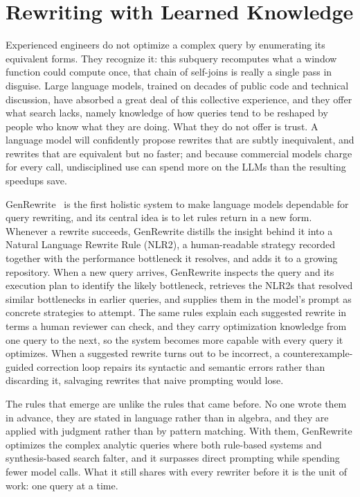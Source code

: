 \section{Rewriting with Learned Knowledge}
\label{sec:intro:knowledge}

Experienced engineers do not optimize a complex query by enumerating its
equivalent forms. They recognize it: this subquery recomputes what a
window function could compute once, that chain of self-joins is really a
single pass in disguise. Large language models, trained on decades of
public code and technical discussion, have absorbed a great deal of this
collective experience, and they offer what search lacks, namely
knowledge of how queries tend to be reshaped by people who know what
they are doing. What they do not offer is trust. A language model will confidently
propose rewrites that are subtly inequivalent, and rewrites that are
equivalent but no faster; and because commercial models charge for
every call, undisciplined use can spend more on the LLMs than the
resulting speedups save.

GenRewrite~\cite{genrewrite} is the first holistic system to make
language models dependable for query rewriting, and its central idea is to let rules
return in a new form. Whenever a rewrite succeeds, GenRewrite distills
the insight behind it into a Natural Language Rewrite Rule (NLR2), a
human-readable strategy recorded together with the performance
bottleneck it resolves, and adds it to a growing repository. When a new
query arrives, GenRewrite inspects the query and its execution plan to
identify the likely bottleneck, retrieves the NLR2s that resolved
similar bottlenecks in earlier queries, and supplies them in the
model's prompt as concrete strategies to attempt. The same rules
explain each suggested rewrite in terms a human reviewer can check, and
they carry optimization knowledge from one query to the next, so the
system becomes more capable with every query it optimizes. When a
suggested rewrite turns out to be incorrect, a counterexample-guided
correction loop repairs its syntactic and semantic errors rather than
discarding it, salvaging rewrites that naive prompting would lose.

The rules that emerge are unlike the rules that came before. No one
wrote them in advance, they are stated in language rather than in
algebra, and they are applied with judgment rather than by pattern
matching. With them, GenRewrite optimizes the complex analytic queries
where both rule-based systems and synthesis-based search falter, and it
surpasses direct prompting while spending fewer model calls. What it
still shares with every rewriter before it is the unit of work: one
query at a time.

